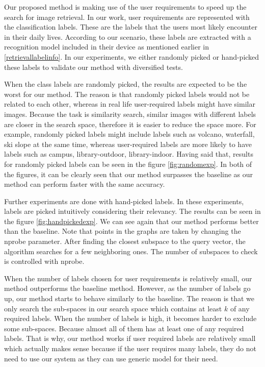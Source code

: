 Our proposed method is making use of the user requirements to speed up the search for image retrieval. 
In our work, user requirements are represented with the classification labels. 
These are the labels that the users most likely encounter in their daily lives. 
According to our scenario, these labels are extracted with a recognition model included in their device as mentioned earlier in \ref{retrievallabelinfo}. 
In our experiments, we either randomly picked or hand-picked these labels to validate our method with diversified tests.

When the class labels are randomly picked, the results are expected to be the worst for our method. 
The reason is that randomly picked labels would not be related to each other, whereas in real life user-required labels might have similar images. 
Because the task is similarity search, similar images with different labels are closer in the search space, therefore it is easier to reduce the space more.
For example, randomly picked labels might include labels such as volcano, waterfall, ski slope at the same time, whereas user-required labels are more likely to have labels such as campus, library-outdoor, library-indoor.
Having said that, results for randomly picked labels can be seen in the figure \ref{fig:randomexp}.
In both of the figures, it can be clearly seen that our method surpasses the baseline as our method can perform faster with the same accuracy.

Further experiments are done with hand-picked labels. 
In these experiments, labels are picked intuitively considering their relevancy. 
The results can be seen in the figure \ref{fig:handpickedexp}. 
We can see again that our method performs better than the baseline.
Note that points in the graphs are taken by changing the nprobe parameter. 
After finding the closest subspace to the query vector, the algorithm searches for a few neighboring ones. 
The number of subspaces to check is controlled with nprobe.


When the number of labels chosen for user requirements is relatively small, our method outperforms the baseline method.
However, as the number of labels go up, our method starts to behave similarly to the baseline.
The reason is that we only search the sub-spaces in our search space which contains at least $k$ of any required labels. 
When the number of labels is high, it becomes harder to exclude some sub-spaces. Because almost all of them has at least one of any required labels. 
That is why, our method works if user required labels are relatively small which actually makes sense because if the user requires many labels, they do not need to use our system as they can use generic model for their need.


